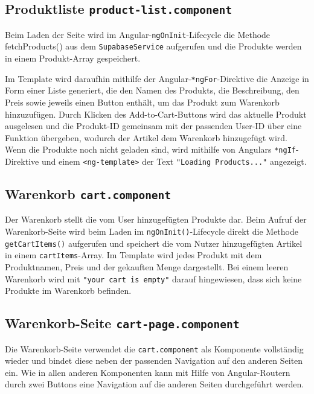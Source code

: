 \documentclass[oneside]{ausarbeitung}
\begin{document}
\subsection{Produktliste \texttt{product-list.component}}

Beim Laden der Seite wird im Angular-\texttt{ngOnInit}-Lifecycle die Methode fetchProducts() aus dem \texttt{SupabaseService} aufgerufen und die Produkte werden in einem Produkt-Array gespeichert.

Im Template wird daraufhin mithilfe der Angular-\texttt{*ngFor}-Direktive die Anzeige in Form einer Liste generiert, die den Namen des Produkts, die Beschreibung, den Preis sowie jeweils einen Button enthält, um das Produkt zum Warenkorb hinzuzufügen.
Durch Klicken des Add-to-Cart-Buttons wird das aktuelle Produkt ausgelesen und die Produkt-ID gemeinsam mit der passenden User-ID über eine Funktion übergeben, wodurch der Artikel dem Warenkorb hinzugefügt wird.
Wenn die Produkte noch nicht geladen sind, wird mithilfe von Angulars \texttt{*ngIf}-Direktive und einem \texttt{<ng-template>} der Text \texttt{"Loading Products..."} angezeigt.


\subsection{Warenkorb \texttt{cart.component}}

Der Warenkorb stellt die vom User hinzugefügten Produkte dar. Beim Aufruf der Warenkorb-Seite wird beim Laden im \texttt{ngOnInit()}-Lifecycle direkt die Methode \texttt{getCartItems()} aufgerufen und speichert die vom Nutzer hinzugefügten Artikel in einem \texttt{cartItems}-Array. Im Template wird jedes Produkt mit dem Produktnamen, Preis und der gekauften Menge dargestellt. Bei einem leeren Warenkorb wird mit \texttt{"your cart is empty"} darauf hingewiesen, dass sich keine Produkte im Warenkorb befinden.

\subsection{Warenkorb-Seite \texttt{cart-page.component}}

Die Warenkorb-Seite verwendet die \texttt{cart.component} als Komponente vollständig wieder und bindet diese neben der passenden Navigation auf den anderen Seiten ein. Wie in allen anderen Komponenten kann mit Hilfe von Angular-Routern durch zwei Buttons eine Navigation auf die anderen Seiten durchgeführt werden.

\end{document}
